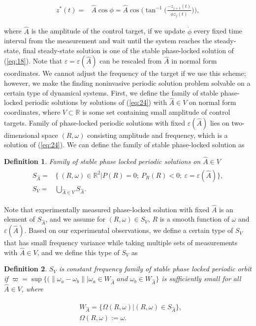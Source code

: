 \documentclass[openacc]{rsproca_new}%
\def\real{\mathbb{R}}
\def\epsilon{\varepsilon}
\newcommand{\Eref}[1]{(\ref{#1})}
\newtheorem{definition}{\bf Definition}[section]
\begin{document}
\begin{align}\label{eq:26}
z^*(t)=&\hat A\cos{\phi}=\hat A\cos\Big(\tan^{-1}\Big({\frac{-z_{j+1}(t)}{ \dot \phi z_{j}(t)}}\Big) \Big),
\end{align}

\noindent where $\hat A$ is the amplitude of the control target, if we update $\dot\phi$ every fixed time interval from the measurement and wait until the system reaches the steady-state, final steady-state solution is one of the stable phase-locked solution of \Eref{eq:18}. Note that $\epsilon=\epsilon(\hat A)$ can be rescaled from $\hat A$ in normal form coordinates. We cannot adjust the frequency of the target if we use this scheme; however, we make the finding noninvasive periodic solution problem solvable on a certain type of dynamical systems. First, we define the family of stable phase-locked periodic solutions by solutions of \Eref{eq:24} with $\hat A \in V$ on normal form coordinates, where $V \subset \real$ is some set containing small amplitude of control targets. Family of phase-locked periodic solutions with fixed $\epsilon(\hat A)$ lies on two-dimensional space $(R,\omega)$ consisting amplitude and frequency, which is a solution of \Eref{eq:24}. We can define the family of stable phase-locked solution as

\begin{definition}\label{d2}
Family of stable phase locked periodic solutions on $\hat A \in V$
\begin{align}\label{eq:27}
  \begin{split}
S_{\hat A}=&\{\:(R,\omega)\in \real^2| P(R)=0;\:P_R(R)<0;\:\epsilon=\epsilon(\hat A)\},\\
S_{V}=&\bigcup_{\hat A \in V} S_{\hat A}.
\end{split}
\end{align}
\end{definition}

\noindent Note that experimentally measured phase-locked solution with fixed $\hat A$ is an element of $S_{\hat A}$, and we assume for $(R,\omega)\in S_{V}$, $R$ is a smooth function of $\omega$ and $\epsilon(\hat A)$. Based on our experimental observations, we define a certain type of $S_{V}$ that has small frequency variance while taking multiple sets of measurements with $\hat A \in V$, and we define this type of $S_{V}$ as

\begin{definition}\label{d3}
$S_V$ is constant frequency family of stable phase locked periodic orbit if $\varpi=\sup \{( \|\omega_a- \omega_b\| | \omega_a \in W_{\hat A}  \; and \;  \omega_b\in W_{\hat A}\}$ is sufficiently small for all $\hat A \in V$, where

\begin{align}\label{eq:28}
  \begin{split}
&W_{\hat A}=\{\Omega(R,\omega)|(R,\omega) \in S_{\hat A}\},\\
&\Omega(R,\omega):=\omega.
\end{split}
\end{align}
\end{definition}
\end{document}

